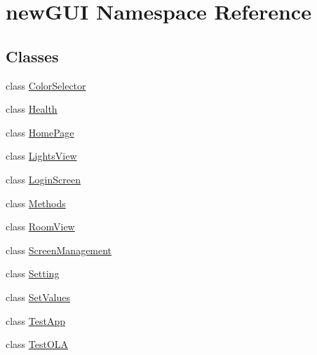 \hypertarget{namespacenewGUI}{}\section{new\+G\+UI Namespace Reference}
\label{namespacenewGUI}
\subsection*{Classes}
\begin{DoxyCompactItemize}
\item 
class \hyperlink{classnewGUI_1_1ColorSelector}{Color\+Selector}
\item 
class \hyperlink{classnewGUI_1_1Health}{Health}
\item 
class \hyperlink{classnewGUI_1_1HomePage}{Home\+Page}
\item 
class \hyperlink{classnewGUI_1_1LightsView}{Lights\+View}
\item 
class \hyperlink{classnewGUI_1_1LoginScreen}{Login\+Screen}
\item 
class \hyperlink{classnewGUI_1_1Methods}{Methods}
\item 
class \hyperlink{classnewGUI_1_1RoomView}{Room\+View}
\item 
class \hyperlink{classnewGUI_1_1ScreenManagement}{Screen\+Management}
\item 
class \hyperlink{classnewGUI_1_1Setting}{Setting}
\item 
class \hyperlink{classnewGUI_1_1SetValues}{Set\+Values}
\item 
class \hyperlink{classnewGUI_1_1TestApp}{Test\+App}
\item 
class \hyperlink{classnewGUI_1_1TestOLA}{Test\+O\+LA}
\end{DoxyCompactItemize}
